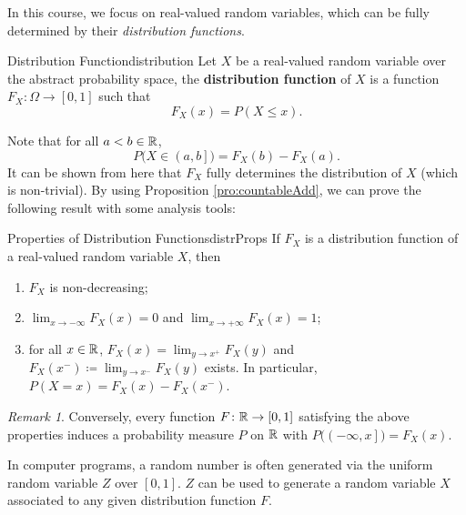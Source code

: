 \documentclass[math]{amznotes}
\theoremstyle{remark}
\newtheorem*{remark}{Remark}
\newcommand{\0}{\mathbf{0}}
\newcommand{\1}{\mathbf{1}}
\begin{document}
In this course, we focus on real-valued random variables, which can be fully determined by their \textit{distribution functions}.
\begin{dfnbox}{Distribution Function}{distribution}
    Let $X$ be a real-valued random variable over the abstract probability space, the {\color{red} \textbf{distribution function}} of $X$ is a function $F_X \colon \Omega \to \left[0, 1\right]$ such that 
    \begin{equation*}
        F_X\left(x\right) = P\left(X \leq x\right).
    \end{equation*}
\end{dfnbox}
Note that for all $a < b \in \mathbb{R}$, 
\begin{equation*}
    P\bigl(X \in \left(a, b\right]\bigr) = F_X\left(b\right) - F_X\left(a\right).
\end{equation*}
It can be shown from here that $F_X$ fully determines the distribution of $X$ (which is non-trivial). By using Proposition \ref{pro:countableAdd}, we can prove the following result with some analysis tools:
\begin{probox}{Properties of Distribution Functions}{distrProps}
    If $F_X$ is a distribution function of a real-valued random variable $X$, then 
    \begin{enumerate}
        \item $F_X$ is non-decreasing;
        \item $\lim_{x \to -\infty}F_X\left(x\right) = 0$ and $\lim_{x \to +\infty}F_X\left(x\right) = 1$;
        \item for all $x \in \mathbb{R}$, $F_X\left(x\right) = \lim_{y \to x^+}F_X\left(y\right)$ and $F_X\left(x^-\right) \coloneqq \lim_{y \to x^-}F_X\left(y\right)$ exists. In particular, $P\left(X = x\right) = F_X\left(x\right) - F_X\left(x^-\right)$.
    \end{enumerate}
\end{probox}
\begin{notebox}
    \begin{remark}
        Conversely, every function $F \colon \mathbb{R} \to \left[0, 1\right]$ satisfying the above properties induces a probability measure $P$ on $\mathbb{R}$ with $P\bigl(\left(-\infty, x\right]\bigr) = F_X\left(x\right)$.
    \end{remark}
\end{notebox}
In computer programs, a random number is often generated via the uniform random variable $Z$ over $\left[0, 1\right]$. $Z$ can be used to generate a random variable $X$ associated to any given distribution function $F$.
\end{document}
